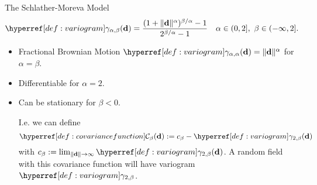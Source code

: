 \begin{frame}{The Schlather-Moreva Model}
	\begin{equation*}
		\variogram_{\alpha,\beta}(\step)
		= \frac{(1+\|\step\|^\alpha)^{\beta/\alpha}-1}{2^{\beta/\alpha}-1}
		\quad \alpha\in (0,2],\ \beta\in(-\infty, 2].
	\end{equation*}
	\begin{itemize}
		\item Fractional Brownian Motion \(\variogram_{\alpha,\alpha}(\step)=\|\step\|^\alpha\) for \(\alpha=\beta\).
		\item Differentiable for \(\alpha=2\).
		\item Can be stationary for \(\beta<0\). 

		I.e. we can define
		\[
			\C_\beta(\step) := c_\beta - \variogram_{2,\beta}(\step)
		\]
		with \(c_\beta := \lim_{\|\step\|\to\infty}\variogram_{2,\beta}(\step)\).
		A random field with this covariance function will have variogram
		\(\variogram_{2,\beta}\).
	\end{itemize}
\end{frame}